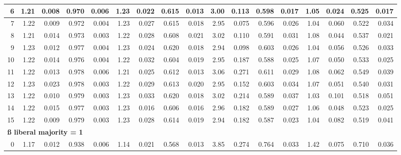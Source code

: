\documentclass[
]{article}
\begin{document}
\begin{table}[H]
{\begin{tabular}[t]{r|r|r|r|r|r|r|r|r|r|r|r|r|r|r|r|r}
\hline
\hspace{1em}6 & 1.21 & 0.008 & 0.970 & 0.006 & 1.23 & 0.022 & 0.615 & 0.013 & 3.00 & 0.113 & 0.598 & 0.017 & 1.05 & 0.024 & 0.525 & 0.017\\
\hline
\hspace{1em}7 & 1.22 & 0.009 & 0.972 & 0.004 & 1.23 & 0.027 & 0.615 & 0.018 & 2.95 & 0.075 & 0.596 & 0.026 & 1.04 & 0.060 & 0.522 & 0.034\\
\hline
\hspace{1em}8 & 1.21 & 0.014 & 0.973 & 0.003 & 1.22 & 0.028 & 0.608 & 0.021 & 3.02 & 0.110 & 0.591 & 0.031 & 1.08 & 0.044 & 0.537 & 0.021\\
\hline
\hspace{1em}9 & 1.23 & 0.012 & 0.977 & 0.004 & 1.23 & 0.024 & 0.620 & 0.018 & 2.94 & 0.098 & 0.603 & 0.026 & 1.04 & 0.056 & 0.526 & 0.033\\
\hline
\hspace{1em}10 & 1.22 & 0.014 & 0.976 & 0.004 & 1.22 & 0.032 & 0.604 & 0.019 & 2.95 & 0.187 & 0.588 & 0.025 & 1.07 & 0.050 & 0.533 & 0.025\\
\hline
\hspace{1em}11 & 1.22 & 0.013 & 0.978 & 0.006 & 1.21 & 0.025 & 0.612 & 0.013 & 3.06 & 0.271 & 0.611 & 0.029 & 1.08 & 0.062 & 0.549 & 0.039\\
\hline
\hspace{1em}12 & 1.23 & 0.023 & 0.978 & 0.003 & 1.22 & 0.029 & 0.613 & 0.020 & 2.95 & 0.152 & 0.603 & 0.034 & 1.07 & 0.051 & 0.540 & 0.031\\
\hline
\hspace{1em}13 & 1.22 & 0.010 & 0.979 & 0.003 & 1.23 & 0.033 & 0.620 & 0.018 & 3.02 & 0.214 & 0.589 & 0.037 & 1.03 & 0.101 & 0.518 & 0.051\\
\hline
\hspace{1em}14 & 1.22 & 0.015 & 0.977 & 0.003 & 1.23 & 0.016 & 0.606 & 0.016 & 2.96 & 0.182 & 0.589 & 0.027 & 1.06 & 0.048 & 0.523 & 0.025\\
\hline
\hspace{1em}15 & 1.22 & 0.009 & 0.979 & 0.003 & 1.23 & 0.028 & 0.614 & 0.019 & 2.94 & 0.182 & 0.587 & 0.023 & 1.04 & 0.082 & 0.519 & 0.041\\
\hline
\multicolumn{17}{l}{\textbf{ß liberal majority = 1}}\\
\hline
\hspace{1em}0 & 1.17 & 0.012 & 0.938 & 0.006 & 1.14 & 0.021 & 0.568 & 0.013 & 3.85 & 0.274 & 0.764 & 0.033 & 1.42 & 0.075 & 0.710 & 0.036\\

\end{tabular}}
\end{table}
\end{document}
